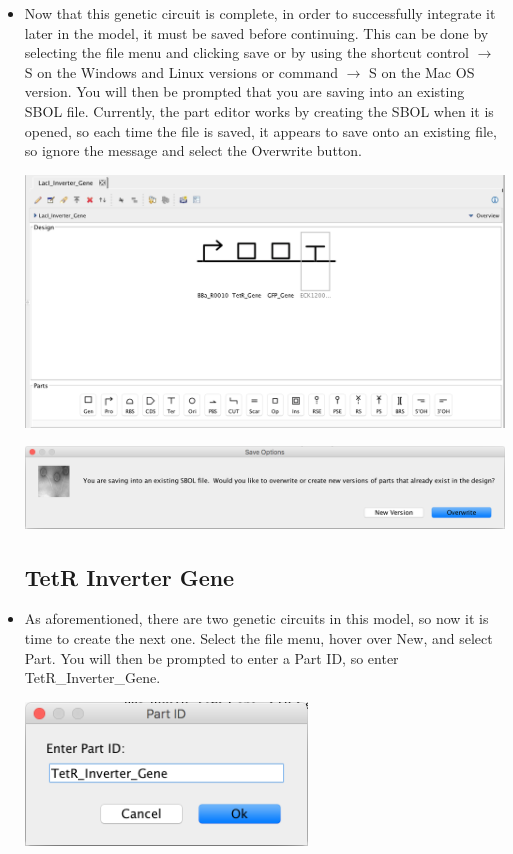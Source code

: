\documentclass[titlepage,11pt]{article}
\begin{document}
\begin{itemize}
\item Now that this genetic circuit is complete, in order to successfully integrate it later in the model, it must be saved before continuing. This can be done by selecting the file menu and clicking save or by using the shortcut control $\rightarrow$ S on the Windows and Linux versions or command $\rightarrow$ S on the Mac OS version. You will then be prompted that you are saving into an existing SBOL file. Currently, the part editor works by creating the SBOL when it is opened, so each time the file is saved, it appears to save onto an existing file, so ignore the message and select the Overwrite button.

\begin{center}
\includegraphics[width=160mm]{screenshots/PartLacIComplete2}
\end{center}

\begin{center}
\includegraphics[width=160mm]{screenshots/PartSave}
\end{center}

\subsection{TetR Inverter Gene}
\item As aforementioned, there are two genetic circuits in this model, so now it is time to create the next one. Select the file menu, hover over New, and select Part. You will then be prompted to enter a Part ID, so enter TetR\_Inverter\_Gene.

\begin{center}
\includegraphics[width=75mm]{screenshots/PartIDTetR}
\end{center}


\end{itemize}
\end{document}
